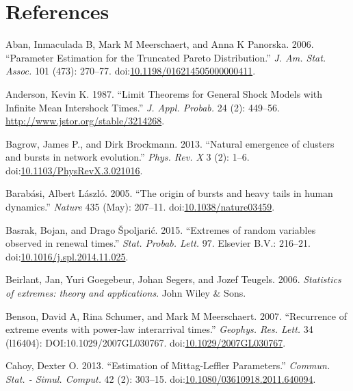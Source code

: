 \documentclass[smallextended]{svjour3}       %
\begin{document}
\section*{References}\label{references}

\hypertarget{refs}{}
\hypertarget{ref-Aban06}{}
Aban, Inmaculada B, Mark M Meerschaert, and Anna K Panorska. 2006.
``Parameter Estimation for the Truncated Pareto Distribution.'' \emph{J.
Am. Stat. Assoc.} 101 (473): 270--77.
doi:\href{https://doi.org/10.1198/016214505000000411}{10.1198/016214505000000411}.

\hypertarget{ref-Anderson1987}{}
Anderson, Kevin K. 1987. ``Limit Theorems for General Shock Models with
Infinite Mean Intershock Times.'' \emph{J. Appl. Probab.} 24 (2):
449--56. \url{http://www.jstor.org/stable/3214268}.

\hypertarget{ref-Bagrow2013}{}
Bagrow, James P., and Dirk Brockmann. 2013. ``Natural emergence of
clusters and bursts in network evolution.'' \emph{Phys. Rev. X} 3 (2):
1--6.
doi:\href{https://doi.org/10.1103/PhysRevX.3.021016}{10.1103/PhysRevX.3.021016}.

\hypertarget{ref-Barabasi2005}{}
Barabási, Albert László. 2005. ``The origin of bursts and heavy tails in
human dynamics.'' \emph{Nature} 435 (May): 207--11.
doi:\href{https://doi.org/10.1038/nature03459}{10.1038/nature03459}.

\hypertarget{ref-Basrak2014}{}
Basrak, Bojan, and Drago Špoljarić. 2015. ``Extremes of random variables
observed in renewal times.'' \emph{Stat. Probab. Lett.} 97. Elsevier
B.V.: 216--21.
doi:\href{https://doi.org/10.1016/j.spl.2014.11.025}{10.1016/j.spl.2014.11.025}.

\hypertarget{ref-beirlantBook}{}
Beirlant, Jan, Yuri Goegebeur, Johan Segers, and Jozef Teugels. 2006.
\emph{Statistics of extremes: theory and applications}. John Wiley \&
Sons.

\hypertarget{ref-Benson2007}{}
Benson, David A, Rina Schumer, and Mark M Meerschaert. 2007.
``Recurrence of extreme events with power-law interarrival times.''
\emph{Geophys. Res. Lett.} 34 (l16404): DOI:10.1029/2007GL030767.
doi:\href{https://doi.org/10.1029/2007GL030767}{10.1029/2007GL030767}.

\hypertarget{ref-Cahoy2013}{}
Cahoy, Dexter O. 2013. ``Estimation of Mittag-Leffler Parameters.''
\emph{Commun. Stat. - Simul. Comput.} 42 (2): 303--15.
doi:\href{https://doi.org/10.1080/03610918.2011.640094}{10.1080/03610918.2011.640094}.
\end{document}
